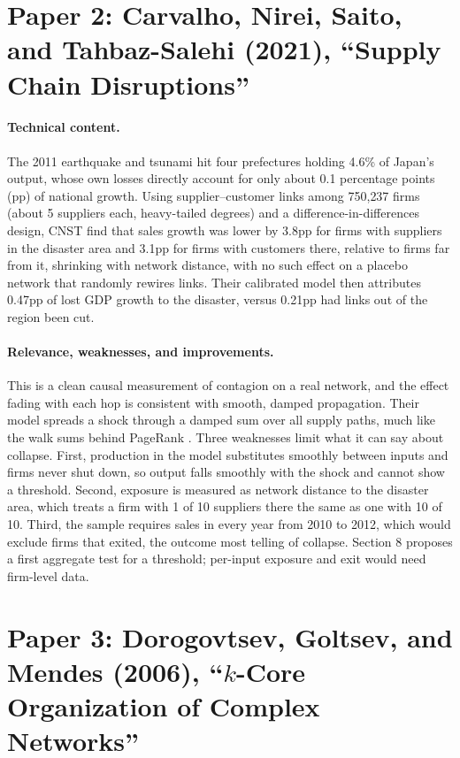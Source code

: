 \documentclass[10pt]{article}
\begin{document}
\section{Paper 2: Carvalho, Nirei, Saito, and Tahbaz-Salehi (2021), ``Supply Chain Disruptions''}
\paragraph{Technical content.} The 2011 earthquake and tsunami hit four prefectures holding 4.6\% of Japan's output, whose own losses directly account for only about 0.1 percentage points (pp) of national growth. Using supplier--customer links among 750{,}237 firms (about 5 suppliers each, heavy-tailed degrees) and a difference-in-differences design, CNST find that sales growth was lower by 3.8pp for firms with suppliers in the disaster area and 3.1pp for firms with customers there, relative to firms far from it, shrinking with network distance, with no such effect on a placebo network that randomly rewires links. Their calibrated model then attributes 0.47pp of lost GDP growth to the disaster, versus 0.21pp had links out of the region been cut.

\paragraph{Relevance, weaknesses, and improvements.} This is a clean causal measurement of contagion on a real network, and the effect fading with each hop is consistent with smooth, damped propagation. Their model spreads a shock through a damped sum over all supply paths, much like the walk sums behind PageRank \cite[\S14.6]{ek2010}. Three weaknesses limit what it can say about collapse. First, production in the model substitutes smoothly between inputs and firms never shut down, so output falls smoothly with the shock and cannot show a threshold. Second, exposure is measured as network distance to the disaster area, which treats a firm with 1 of 10 suppliers there the same as one with 10 of 10. Third, the sample requires sales in every year from 2010 to 2012, which would exclude firms that exited, the outcome most telling of collapse. Section 8 proposes a first aggregate test for a threshold; per-input exposure and exit would need firm-level data.

\section[Paper 3: Dorogovtsev, Goltsev, and Mendes (2006), k-Core Organization]{Paper 3: Dorogovtsev, Goltsev, and Mendes (2006), ``$k$-Core Organization of Complex Networks''}
\end{document}
